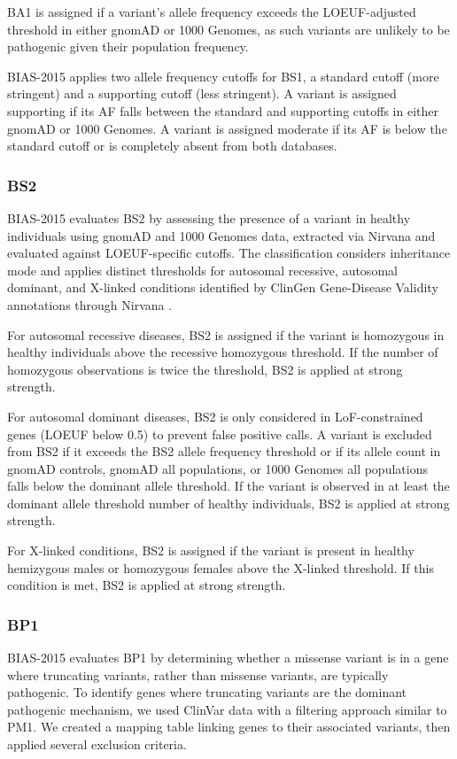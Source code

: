 \documentclass[unnumsec,webpdf,contemporary,large]{oup-authoring-template}
\theoremstyle{thmstyleone}
\theoremstyle{thmstyletwo}
\theoremstyle{thmstylethree}
\begin{document}
BA1 is assigned if a variant’s allele frequency exceeds the LOEUF-adjusted threshold in either gnomAD or 1000 Genomes, as such variants are unlikely to be pathogenic given their population frequency.

BIAS-2015 applies two allele frequency cutoffs for BS1, a standard cutoff (more stringent) and a supporting cutoff (less stringent). A variant is assigned supporting if its AF falls between the standard and supporting cutoffs in either gnomAD or 1000 Genomes. A variant is assigned moderate if its AF is below the standard cutoff or is completely absent from both databases.

\subsubsection{BS2}
BIAS-2015 evaluates BS2 by assessing the presence of a variant in healthy individuals using gnomAD and 1000 Genomes data, extracted via Nirvana and evaluated against LOEUF-specific cutoffs. The classification considers inheritance mode and applies distinct thresholds for autosomal recessive, autosomal dominant, and X-linked conditions identified by ClinGen Gene-Disease Validity annotations through Nirvana \cite{strande2017clingen}.

For autosomal recessive diseases, BS2 is assigned if the variant is homozygous in healthy individuals above the recessive homozygous threshold. If the number of homozygous observations is twice the threshold, BS2 is applied at strong strength.

For autosomal dominant diseases, BS2 is only considered in LoF-constrained genes (LOEUF below 0.5) to prevent false positive calls. A variant is excluded from BS2 if it exceeds the BS2 allele frequency threshold or if its allele count in gnomAD controls, gnomAD all populations, or 1000 Genomes all populations falls below the dominant allele threshold. If the variant is observed in at least the dominant allele threshold number of healthy individuals, BS2 is applied at strong strength.

For X-linked conditions, BS2 is assigned if the variant is present in healthy hemizygous males or homozygous females above the X-linked threshold. If this condition is met, BS2 is applied at strong strength.

\subsubsection{BP1}
BIAS-2015 evaluates BP1 by determining whether a missense variant is in a gene where truncating variants, rather than missense variants, are typically pathogenic. To identify genes where truncating variants are the dominant pathogenic mechanism, we used ClinVar data with a filtering approach similar to PM1. We created a mapping table linking genes to their associated variants, then applied several exclusion criteria.
\end{document}
